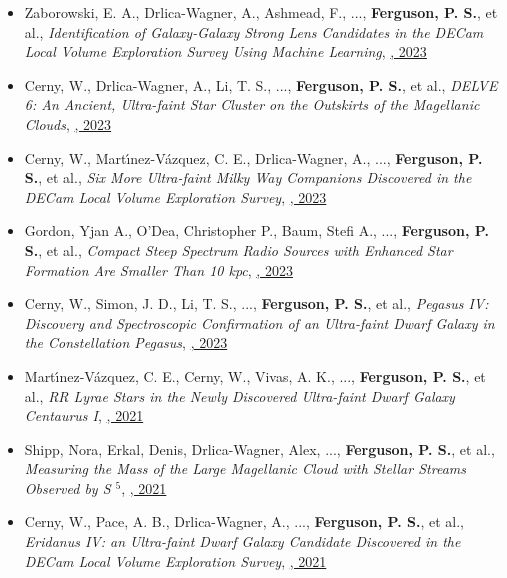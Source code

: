 \begin{itemize}[itemsep=1pt]
    \item {Zaborowski}, E. A., {Drlica-Wagner}, A., {Ashmead}, F., ..., \textbf{Ferguson, P. S.}, et al., \textit{{Identification of Galaxy-Galaxy Strong Lens Candidates in the DECam Local Volume Exploration Survey Using Machine Learning}}, \href{https://ui.adsabs.harvard.edu/abs/2023ApJ...954...68Z}{\textbf{\apj}, 2023}
    \item {Cerny}, W., {Drlica-Wagner}, A., {Li}, T. S., ..., \textbf{Ferguson, P. S.}, et al., \textit{{DELVE 6: An Ancient, Ultra-faint Star Cluster on the Outskirts of the Magellanic Clouds}}, \href{https://ui.adsabs.harvard.edu/abs/2023ApJ...953L..21C}{\textbf{\apjl}, 2023}
    \item {Cerny}, W., {Mart{\'\i}nez-V{\'a}zquez}, C. E., {Drlica-Wagner}, A., ..., \textbf{Ferguson, P. S.}, et al., \textit{{Six More Ultra-faint Milky Way Companions Discovered in the DECam Local Volume Exploration Survey}}, \href{https://ui.adsabs.harvard.edu/abs/2023ApJ...953....1C}{\textbf{\apj}, 2023}
    \item {Gordon}, Yjan A., {O'Dea}, Christopher P., {Baum}, Stefi A., ..., \textbf{Ferguson, P. S.}, et al., \textit{{Compact Steep Spectrum Radio Sources with Enhanced Star Formation Are Smaller Than 10 kpc}}, \href{https://ui.adsabs.harvard.edu/abs/2023ApJ...948L...9G}{\textbf{\apjl}, 2023}
    \item {Cerny}, W., {Simon}, J. D., {Li}, T. S., ..., \textbf{Ferguson, P. S.}, et al., \textit{{Pegasus IV: Discovery and Spectroscopic Confirmation of an Ultra-faint Dwarf Galaxy in the Constellation Pegasus}}, \href{https://ui.adsabs.harvard.edu/abs/2023ApJ...942..111C}{\textbf{\apj}, 2023}
    \item {Mart{\'\i}nez-V{\'a}zquez}, C. E., {Cerny}, W., {Vivas}, A. K., ..., \textbf{Ferguson, P. S.}, et al., \textit{{RR Lyrae Stars in the Newly Discovered Ultra-faint Dwarf Galaxy Centaurus I}}, \href{https://ui.adsabs.harvard.edu/abs/2021AJ....162..253M}{\textbf{\aj}, 2021}
    \item {Shipp}, Nora, {Erkal}, Denis, {Drlica-Wagner}, Alex, ..., \textbf{Ferguson, P. S.}, et al., \textit{{Measuring the Mass of the Large Magellanic Cloud with Stellar Streams Observed by S $^{5}$}}, \href{https://ui.adsabs.harvard.edu/abs/2021ApJ...923..149S}{\textbf{\apj}, 2021}
    \item {Cerny}, W., {Pace}, A. B., {Drlica-Wagner}, A., ..., \textbf{Ferguson, P. S.}, et al., \textit{{Eridanus IV: an Ultra-faint Dwarf Galaxy Candidate Discovered in the DECam Local Volume Exploration Survey}}, \href{https://ui.adsabs.harvard.edu/abs/2021ApJ...920L..44C}{\textbf{\apjl}, 2021}

\end{itemize}
